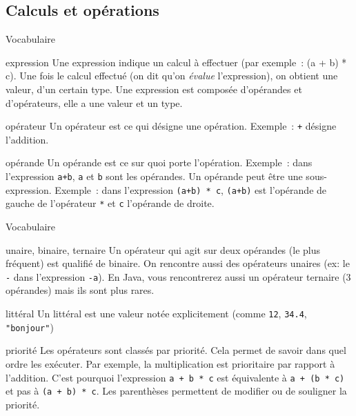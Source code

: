 \begin{hideedit}
\subsection{Calculs et opérations}
\begin{frame}[fragile]{Vocabulaire}
  \begin{block}{expression}
        Une expression indique un calcul à effectuer
        (par exemple~: (a + b) * c).
        Une fois le calcul effectué
        (on dit qu’on \emph{évalue} l’expression), 
        on obtient une valeur, d’un certain type.
        Une expression est composée d’opérandes et d’opérateurs,
        elle a une valeur et un type.
  \end{block}
  \pause
  \begin{block}{opérateur}
        Un opérateur est ce qui désigne une opération.
        Exemple~: \Verb_+_ désigne l’addition.
  \end{block}
  \pause
  \begin{block}{opérande}
        Un opérande est ce sur quoi porte l’opération.
        Exemple~: dans l’expression \Verb_a+b_, 
        \Verb_a_ et \Verb_b_ sont les opérandes.
        Un opérande peut être une sous-expression.
        Exemple~: dans l’expression \Verb_(a+b) * c_, 
        \Verb_(a+b)_ est l’opérande 
        de gauche de l’opérateur \Verb_*_ et \Verb_c_ l'opérande de 
        droite.
  \end{block}
\end{frame}
\begin{frame}[fragile]{Vocabulaire}
  \begin{block}{unaire, binaire, ternaire}
        Un opérateur qui agit sur deux opérandes (le plus fréquent)
        est qualifié de binaire. 
        On rencontre aussi des opérateurs unaires (ex: le \Verb_-_ 
        dans l’expression \Verb_-a_).
        En Java, vous rencontrerez aussi un opérateur ternaire (3 opérandes)
        mais ils sont plus rares.
  \end{block}
  \pause
  \begin{block}{littéral}
        Un littéral est une valeur notée explicitement 
        (comme \Verb_12_, \Verb_34.4_, \Verb_"bonjour"_)
  \end{block}
  \pause
  \begin{block}{priorité}
        Les opérateurs sont classés par priorité.  Cela permet de savoir
        dans quel ordre les exécuter.  Par exemple, la multiplication
        est prioritaire par rapport à l'addition.  C’est pourquoi
        l'expression \Verb_a + b * c_ est équivalente à 
        \Verb_a + (b * c)_ et pas à \Verb_(a + b) * c_.  
        Les parenthèses permettent
        de modifier ou de souligner la priorité.  
  \end{block}
\end{frame}


\end{hideedit}
